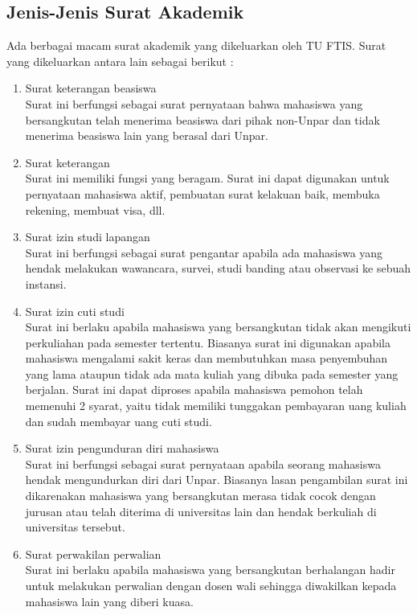 \subsection{Jenis-Jenis Surat Akademik}
\label{sec:jenis_jenis_surat_akademik}
Ada berbagai macam surat akademik yang dikeluarkan oleh TU FTIS. Surat yang dikeluarkan antara lain sebagai berikut :
\begin{enumerate}
	\item Surat keterangan beasiswa \\
	Surat ini berfungsi sebagai surat pernyataan bahwa mahasiswa yang bersangkutan telah menerima beasiswa dari pihak non-Unpar dan tidak menerima beasiswa lain yang berasal dari Unpar.

	\item Surat keterangan \\
	Surat ini memiliki fungsi yang beragam. Surat ini dapat digunakan untuk pernyataan mahasiswa aktif, pembuatan surat kelakuan baik, membuka rekening, membuat visa, dll.
	
	\item Surat izin studi lapangan \\
	Surat ini berfungsi sebagai surat pengantar apabila ada mahasiswa yang hendak melakukan wawancara, survei, studi banding atau observasi ke sebuah instansi.
	
	\item Surat izin cuti studi \\
	Surat ini berlaku apabila mahasiswa yang bersangkutan tidak akan mengikuti perkuliahan pada semester tertentu. Biasanya surat ini digunakan apabila mahasiswa mengalami sakit keras dan membutuhkan masa penyembuhan yang lama ataupun tidak ada mata kuliah yang dibuka pada semester yang berjalan. Surat ini dapat diproses apabila mahasiswa pemohon telah memenuhi 2 syarat, yaitu tidak memiliki tunggakan pembayaran uang kuliah dan sudah membayar uang cuti studi.
	
	\item Surat izin pengunduran diri mahasiswa \\
	Surat ini berfungsi sebagai surat pernyataan apabila seorang mahasiswa hendak mengundurkan diri dari Unpar. Biasanya lasan pengambilan surat ini dikarenakan mahasiswa yang bersangkutan merasa tidak cocok dengan jurusan atau telah diterima di universitas lain dan hendak berkuliah di universitas tersebut.

	\item Surat perwakilan perwalian \\
	Surat ini berlaku apabila mahasiswa yang bersangkutan berhalangan hadir untuk melakukan perwalian dengan dosen wali sehingga diwakilkan kepada mahasiswa lain yang diberi kuasa.
	

\end{enumerate}
